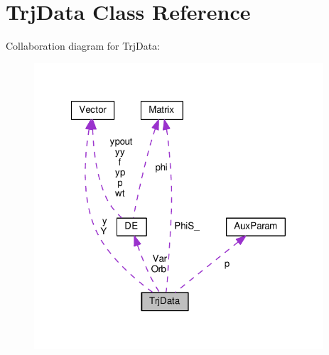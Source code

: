 \hypertarget{classTrjData}{\section{Trj\-Data Class Reference}
\label{classTrjData}
}


Collaboration diagram for Trj\-Data\-:\nopagebreak
\begin{figure}[H]
\begin{center}
\leavevmode
\includegraphics[width=305pt]{classTrjData__coll__graph}
\end{center}
\end{figure}
